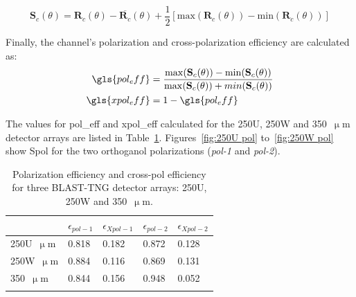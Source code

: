 \begin{equation}
  \mathbf{S}_{c}(\theta) = \mathbf{R}_{c}(\theta) - \overline{\mathbf{R}_{c}}(\theta) + \frac{1}{2} \left[ \mathrm{max}\left( \mathbf{R}_{c}(\theta) \right) - \mathrm{min}\left( \mathbf{R}_{c}(\theta) \right) \right]
\end{equation}

Finally, the channel's polarization and cross-polarization efficiency are calculated as:
\begin{equation}
  \begin{aligned}
   \gls{pol_eff} &= \frac{ \mathrm{max}(\mathbf{S}_{c}(\theta)) - \mathrm{min}(\mathbf{S}_{c}(\theta)) }{ \mathrm{max}(\mathbf{S}_{c}(\theta)) + min(\mathbf{S}_{c}(\theta))} \\
   \gls{xpol_eff} &= 1 - \gls{pol_eff}
 \end{aligned}
\end{equation}

The values for \gls{pol_eff} and \gls{xpol_eff} calculated for the 250U, 250W and 350~$\upmu$m detector arrays are listed in Table~\ref{table:pol eff}. Figures~\ref{fig:250U pol} to~\ref{fig:250W pol} show \gls{Spol} for the two orthoganol polarizations (\textit{pol-1} and \textit{pol-2}).

\begin{table}[!htbp]
\centering
\begin{tabular}{@{}lllll@{}}
\dtoprule{}
 & $\epsilon_{pol-1}$ & $\epsilon_{Xpol-1}$ & $\epsilon_{pol-2}$ & $\epsilon_{Xpol-2}$ \\ \midrule
250U~$\upmu$m & 0.818 & 0.182 & 0.872 & 0.128 \\
250W~$\upmu$m & 0.884 & 0.116 & 0.869 & 0.131 \\
350~$\upmu$m & 0.844 & 0.156 & 0.948 & 0.052 \\ \dbottomrule{}
\\
\end{tabular}
\caption{Polarization efficiency  and cross-pol efficiency  for three BLAST-TNG detector arrays: 250U, 250W and 350~$\upmu$m.}
\label{table:pol eff}
\end{table}

